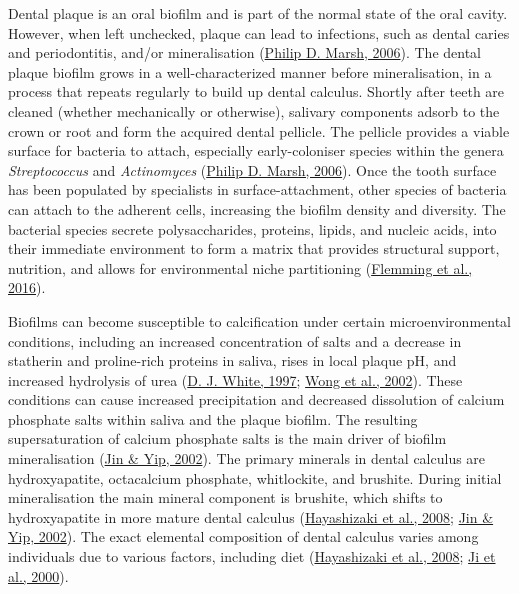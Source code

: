 \documentclass[
  letterpaper,
]{book}
\begin{document}
Dental plaque is an oral biofilm and is part of the normal state of the
oral cavity. However, when left unchecked, plaque can lead to
infections, such as dental caries and periodontitis, and/or
mineralisation (\protect\hyperlink{ref-marshDentalPlaque2006}{Philip D.
Marsh, 2006}). The dental plaque biofilm grows in a well-characterized
manner before mineralisation, in a process that repeats regularly to
build up dental calculus. Shortly after teeth are cleaned (whether
mechanically or otherwise), salivary components adsorb to the crown or
root and form the acquired dental pellicle. The pellicle provides a
viable surface for bacteria to attach, especially early-coloniser
species within the genera \emph{Streptococcus} and \emph{Actinomyces}
(\protect\hyperlink{ref-marshDentalPlaque2006}{Philip D. Marsh, 2006}).
Once the tooth surface has been populated by specialists in
surface-attachment, other species of bacteria can attach to the adherent
cells, increasing the biofilm density and diversity. The bacterial
species secrete polysaccharides, proteins, lipids, and nucleic acids,
into their immediate environment to form a matrix that provides
structural support, nutrition, and allows for environmental niche
partitioning
(\protect\hyperlink{ref-flemmingBiofilmsEmergent2016}{Flemming et al.,
2016}).

Biofilms can become susceptible to calcification under certain
microenvironmental conditions, including an increased concentration of
salts and a decrease in statherin and proline-rich proteins in saliva,
rises in local plaque pH, and increased hydrolysis of urea
(\protect\hyperlink{ref-whiteDentalCalculus1997}{D. J. White, 1997};
\protect\hyperlink{ref-wongCalciumPhosphate2002}{Wong et al., 2002}).
These conditions can cause increased precipitation and decreased
dissolution of calcium phosphate salts within saliva and the plaque
biofilm. The resulting supersaturation of calcium phosphate salts is the
main driver of biofilm mineralisation
(\protect\hyperlink{ref-jinSupragingivalCalculus2002}{Jin \& Yip,
2002}). The primary minerals in dental calculus are hydroxyapatite,
octacalcium phosphate, whitlockite, and brushite. During initial
mineralisation the main mineral component is brushite, which shifts to
hydroxyapatite in more mature dental calculus
(\protect\hyperlink{ref-hayashizakiSiteSpecific2008}{Hayashizaki et al.,
2008}; \protect\hyperlink{ref-jinSupragingivalCalculus2002}{Jin \& Yip,
2002}). The exact elemental composition of dental calculus varies among
individuals due to various factors, including diet
(\protect\hyperlink{ref-hayashizakiSiteSpecific2008}{Hayashizaki et al.,
2008}; \protect\hyperlink{ref-jiFluorideMagnesium2000}{Ji et al.,
2000}).
\end{document}
